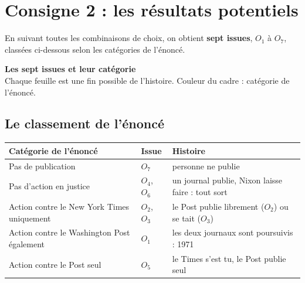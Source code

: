 \documentclass[11pt,a4paper]{article}
\theoremstyle{definition}
\begin{document}
\section{Consigne 2 : les résultats potentiels}

En suivant toutes les combinaisons de choix, on obtient \textbf{sept issues}, $O_1$ à $O_7$, classées ci-dessous selon les catégories de l'énoncé.

\begin{landscape}
\begin{center}{\large\bfseries Les sept issues et leur catégorie}\\[2pt]{\small Chaque feuille est une fin possible de l'histoire. Couleur du cadre : catégorie de l'énoncé.}\end{center}\vspace{-4pt}
\noindent\resizebox{\linewidth}{!}{}
\end{landscape}


\subsection{Le classement de l'énoncé}
\begin{center}
\small
\begin{tabularx}{\textwidth}{@{}>{\raggedright\arraybackslash}p{4.3cm}lX@{}}
\toprule
Catégorie de l'énoncé & Issue & Histoire \\
\midrule
Pas de publication & $O_7$ & personne ne publie \\
Pas d'action en justice & $O_4$, $O_6$ & un journal publie, Nixon laisse faire : tout sort \\
Action contre le New York Times uniquement & $O_2$, $O_3$ & le Post publie librement ($O_2$) ou se tait ($O_3$) \\
Action contre le Washington Post également & $O_1$ & les deux journaux sont poursuivis : 1971 \\
Action contre le Post seul & $O_5$ & le Times s'est tu, le Post publie seul \\
\bottomrule
\end{tabularx}
\end{center}
\end{document}
